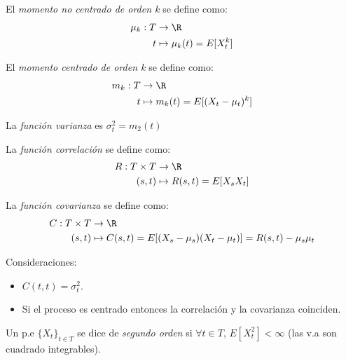 \begin{ndef}
  El \emph{momento no centrado de orden k} se define como:
  \begin{align*}
    \mu_k : T & \to \R \\
    t & \mapsto \mu_k(t) = E[X^k_t]
  \end{align*}
\end{ndef}

\begin{ndef}
  El \emph{momento centrado de orden k} se define como:
  \begin{align*}
    m_k : T & \to \R \\
    t & \mapsto m_k(t) = E[(X_t - \mu_t)^k]
  \end{align*}
\end{ndef}

\begin{ndef}
  La \emph{función varianza} es $\sigma^2_t = m_2(t)$
\end{ndef}

\begin{ndef}
  La \emph{función correlación} se define como:
  \begin{align*}
    R : T \times T & \to \R \\
    (s,t) & \mapsto R(s,t) = E[X_s X_t]
  \end{align*}
\end{ndef}

\begin{ndef}
  La \emph{función covarianza} se define como:
  \begin{align*}
    C: T \times T & \to \R \\
    (s,t) & \mapsto C(s,t) = E[(X_s - \mu_s)(X_t - \mu_t)] = R(s,t) - \mu_s \mu_t
  \end{align*}
\end{ndef}

\begin{nota}
  Consideraciones:
  \begin{itemize}
    \item $C(t,t) = \sigma^2_t$.
    \item Si el proceso es centrado entonces la correlación y la covarianza coinciden.
  \end{itemize}
\end{nota}

\begin{ndef}
  Un p.e $\{X_t\}_{t \in T}$ se dice de \emph{segundo orden} si $\forall t \in T, \, E[X^2_t] < \infty$ (las v.a son cuadrado integrables).
\end{ndef}

